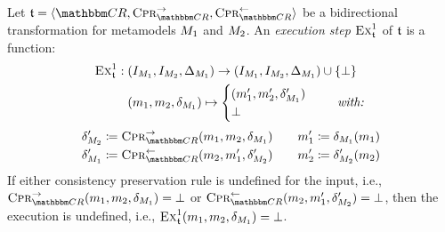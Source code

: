 \begin{definition}
    Let $\transformation{t} = \tupled{\consistencyrelationset{CR}, \consistencypreservationrule{\consistencyrelationset{CR}}^{\rightarrow}, \consistencypreservationrule{\consistencyrelationset{CR}}^{\leftarrow}}$ be a bidirectional transformation for metamodels $\metamodel{M}{1}$ and $\metamodel{M}{2}$.
    An \emph{execution step} $\function{Ex}_{\transformation{t}}^1$ of $\transformation{t}$ is a function:
    \begin{align*}
        \function{Ex}_{\transformation{t}}^1 : \; & (\metamodelinstanceset{M}{1}, \metamodelinstanceset{M}{2}, \changeuniverse{\metamodel{M}{1}}) \rightarrow (\metamodelinstanceset{M}{1}, \metamodelinstanceset{M}{2}, \changeuniverse{\metamodel{M}{1}}) \cup \setted{\bot} \\
        & (\model{m}{1}, \model{m}{2}, \change{\metamodel{M}{1}}) \mapsto 
        \begin{cases} 
            (\model{m}{1}', \model{m}{2}', \change{\metamodel{M}{1}}') \\
            \bot
        \end{cases} 
        \quad \mathtextspacearound{with:}
    \end{align*}%
    \vspace{-\abovedisplayskip}
    \vspace{-\belowdisplayskip}
    \begin{align*}
        \change{\metamodel{M}{2}}' 
        \equalsperdefinition \consistencypreservationrule{\consistencyrelationset{CR}}^{\rightarrow}(\model{m}{1}, \model{m}{2}, \change{\metamodel{M}{1}}) %
        \qquad
        \model{m}{1}' \equalsperdefinition \change{\metamodel{M}{1}}(\model{m}{1}) \\
        \change{\metamodel{M}{1}}' 
        \equalsperdefinition \consistencypreservationrule{\consistencyrelationset{CR}}^{\leftarrow}(\model{m}{2}, \model{m}{1}', \change{\metamodel{M}{2}}') %
        \qquad
        \model{m}{2}' \equalsperdefinition \change{\metamodel{M}{2}}'(\model{m}{2})
    \end{align*}
    If either consistency preservation rule is undefined for the input, i.e., $\consistencypreservationrule{\consistencyrelationset{CR}}^{\rightarrow}(\model{m}{1}, \model{m}{2}, \change{\metamodel{M}{1}}) = \bot$ or $\consistencypreservationrule{\consistencyrelationset{CR}}^{\leftarrow}(\model{m}{2}, \model{m}{1}', \change{\metamodel{M}{2}}') = \bot$, then the execution is undefined, i.e., $\function{Ex}_{\transformation{t}}^1(\model{m}{1}, \model{m}{2}, \change{\metamodel{M}{1}}) = \bot$.

\end{definition}
